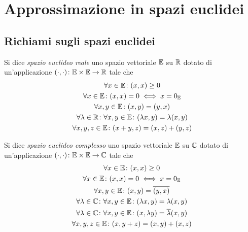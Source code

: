 \chapter{Approssimazione in spazi euclidei}

\section{Richiami sugli spazi euclidei}

	\begin{definizione}
		Si dice \emph{spazio euclideo reale} uno spazio vettoriale \(\mathbb{E}\) su \(\mathbb{R}\) dotato di un'applicazione \((\cdot, \cdot) \colon \mathbb{E} \times \mathbb{E} \to \mathbb{R}\) tale che
		\begin{subequations}
			\begin{gather}
				\forall x \in \mathbb{E} \colon (x, x) \ge 0 \\
				\forall x \in \mathbb{E} \colon (x, x) = 0 \iff x = 0_\mathbb{E} \\
				\forall x, y \in \mathbb{E} \colon (x, y) = (y, x) \\
				\forall \lambda \in \mathbb{R} \colon \forall x, y \in \mathbb{E} \colon (\lambda x, y) = \lambda (x, y) \\
				\forall x, y, z \in \mathbb{E} \colon (x + y, z) = (x, z) + (y, z)
			\end{gather}
		\end{subequations}
	\end{definizione}
	
	\begin{definizione}
		Si dice \emph{spazio euclideo complesso} uno spazio vettoriale \(\mathbb{E}\) su \(\mathbb{C}\) dotato di un'applicazione \((\cdot, \cdot) \colon \mathbb{E} \times \mathbb{E} \to \mathbb{C}\) tale che
		\begin{subequations}
			\begin{gather}
				\forall x \in \mathbb{E} \colon (x, x) \ge 0 \\
				\forall x \in \mathbb{E} \colon (x, x) = 0 \iff x = 0_\mathbb{E} \\
				\forall x, y \in \mathbb{E} \colon (x, y) = \overline{(y, x)} \\
				\forall \lambda \in \mathbb{C} \colon \forall x, y \in \mathbb{E} \colon (\lambda x, y) = \lambda (x, y) \\
				\forall \lambda \in \mathbb{C} \colon \forall x, y \in \mathbb{E} \colon (x, \lambda y) = \overline{\lambda} (x, y) \\
				\forall x, y, z \in \mathbb{E} \colon (x, y + z) = (x, y) + (x, z)
			\end{gather}
		\end{subequations}
	\end{definizione}

